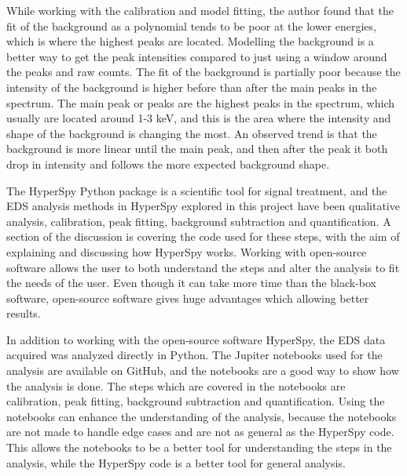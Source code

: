 While working with the calibration and model fitting, the author found that the fit of the background as a polynomial tends to be poor at the lower energies, which is where the highest peaks are located.
Modelling the background is a better way to get the peak intensities compared to just using a window around the peaks and raw counts.
The fit of the background is partially poor because the intensity of the background is higher before than after the main peaks in the spectrum.
The main peak or peaks are the highest peaks in the spectrum, which usually are located around 1-3 keV, and this is the area where the intensity and shape of the background is changing the most.
An observed trend is that the background is more linear until the main peak, and then after the peak it both drop in intensity and follows the more expected background shape.


The HyperSpy Python package is a scientific tool for signal treatment, and the EDS analysis methods in HyperSpy explored in this project have been qualitative analysis, calibration, peak fitting, background subtraction and quantification.
A section of the discussion is covering the code used for these steps, with the aim of explaining and discussing how HyperSpy works.
Working with open-source software allows the user to both understand the steps and alter the analysis to fit the needs of the user.
Even though it can take more time than the black-box software, open-source software gives huge advantages which allowing better results.

In addition to working with the open-source software HyperSpy, the EDS data acquired was analyzed directly in Python.
The Jupiter notebooks used for the analysis are available on GitHub, and the notebooks are a good way to show how the analysis is done.
The steps which are covered in the notebooks are calibration, peak fitting, background subtraction and quantification.
Using the notebooks can enhance the understanding of the analysis, because the notebooks are not made to handle edge cases and are not as general as the HyperSpy code.
This allows the notebooks to be a better tool for understanding the steps in the analysis, while the HyperSpy code is a better tool for general analysis.



